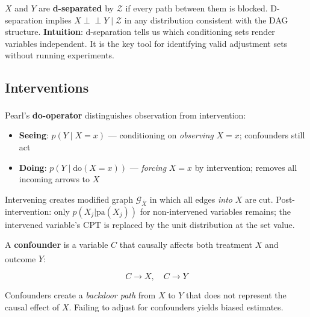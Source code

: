 \begin{tcbitemize}[ skin=sectionraster ]
    $X$ and $Y$ are \textbf{d-separated} by $\mathcal{Z}$ if every path between
    them is blocked. D-separation implies $X \perp\!\!\!\perp Y \mid \mathcal{Z}$
    in any distribution consistent with the DAG structure.
    \tcblower
    \textbf{Intuition}: d-separation tells us which conditioning sets render
    variables independent. It is the key tool for identifying valid adjustment
    sets without running experiments.

    \end{tcbitemize}

    \subsection{Interventions}
    \begin{tcbitemize}[ skin=sectionraster ]

    \tcbitem[title={Seeing vs Doing: The Do-Operator}, raster multicolumn=3]
    Pearl’s \textbf{do-operator} distinguishes observation from
    intervention:\textsuperscript{\cite[][pp.~50--51]{barberBayesianReasoningMachine2012}}

    \begin{itemize}
        \item \textbf{Seeing}: $p(Y \mid X{=}x)$ --- conditioning on
              \emph{observing} $X{=}x$; confounders still act
        \item \textbf{Doing}: $p(Y \mid \mathrm{do}(X{=}x))$ --- \emph{forcing}
              $X{=}x$ by intervention; removes all incoming arrows to $X$
    \end{itemize}

    Intervening creates modified graph $\mathcal{G}_{\overline{X}}$ in which
    all edges \emph{into} $X$ are cut. Post-intervention: only $p(X_j | \mathrm{pa}(X_j))$
    for non-intervened variables remains; the intervened variable’s CPT is replaced
    by the unit distribution at the set value.

    \tcbitem[title=Confounders, raster multicolumn=3]
    A \textbf{confounder} is a variable $C$ that causally affects both
    treatment $X$ and outcome
    $Y$:\textsuperscript{\cite[][Ch.~7]{hernanCausalInferenceWhat2020}}

    \[ C \rightarrow X,\quad C \rightarrow Y \]

    Confounders create a \emph{backdoor path} from $X$ to $Y$ that does not
    represent the causal effect of $X$. Failing to adjust for confounders
    yields biased estimates.


\end{tcbitemize}

